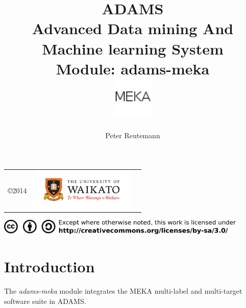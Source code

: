 \documentclass[a4paper]{book}
\title{
  \textbf{ADAMS} \\
  {\Large \textbf{A}dvanced \textbf{D}ata mining \textbf{A}nd \textbf{M}achine
  learning \textbf{S}ystem} \\
  {\Large Module: adams-meka} \\
  \vspace{1cm}
  \includegraphics[width=2cm]{images/meka-module.png} \\
}
\author{
  Peter Reutemann
}
\begin{document}
\begin{titlepage}
\maketitle

\thispagestyle{empty}
\center
\begin{table}[b]
	\begin{tabular}{c l l}
		\parbox[c][2cm]{2cm}{\copyright 2014} &
		\parbox[c][2cm]{5cm}{\includegraphics[width=5cm]{images/coat_of_arms.pdf}} \\
	\end{tabular}
	\includegraphics[width=12cm]{images/cc.png} \\
\end{table}

\end{titlepage}

\tableofcontents
\listoffigures

\chapter{Introduction}
The \textit{adams-meka} module integrates the MEKA \cite{meka} multi-label
and multi-target software suite in ADAMS.

\end{document}
